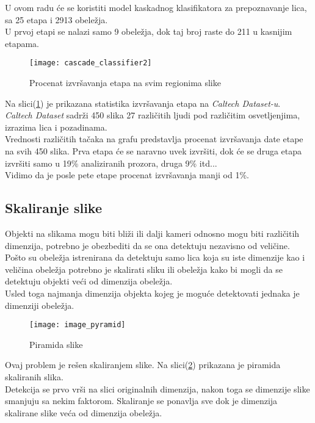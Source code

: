 U ovom radu će se koristiti model kaskadnog klasifikatora za
prepoznavanje lica, sa 25 etapa i 2913 obeležja. \\
U prvoj etapi se nalazi samo 9 obeležja, dok taj broj raste do 211 u kasnijim etapama.

\begin{figure}[H]
  \centering
  \texttt{[image: cascade\_classifier2]}
  \caption{Procenat izvršavanja etapa na svim regionima slike}
  \label{cascade_classifier_img2}
\end{figure}

Na slici(\ref{cascade_classifier_img2}) je prikazana statistika izvršavanja
etapa na \emph{Caltech Dataset-u}\cite{CALTECH_DATASET}.\\
\emph{Caltech Dataset} sadrži 450 slika 27 različitih
ljudi pod različitim osvetljenjima, izrazima lica i pozadinama. \\

Vrednosti različitih tačaka na grafu predstavlja procenat izvršavanja date etape
na svih 450 slika. Prva etapa će se naravno uvek izvršiti, dok će se druga etapa
izvršiti samo u 19\% analiziranih prozora, druga 9\% itd... \\
Vidimo da je posle pete etape procenat izvršavanja manji od 1\%. \\

\subsection{Skaliranje slike}\label{image_scaling}

Objekti na slikama mogu biti bliži ili dalji kameri odnosno mogu biti
različitih dimenzija, potrebno je obezbediti da se ona detektuju nezavisno od
veličine. \\

Pošto su obeležja istrenirana da detektuju samo lica koja su iste dimenzije kao
i veličina obeležja potrebno je skalirati sliku ili obeležja kako bi
mogli da se detektuju objekti veći od dimenzija obeležja. \\
Usled toga najmanja dimenzija objekta kojeg je moguće detektovati jednaka je dimenziji obeležja.

\begin{figure}[H]
  \centering
  \texttt{[image: image\_pyramid]}
  \caption{Piramida slike\cite{ImagePyramid_web}}
  \label{image_pyramid}
\end{figure}

Ovaj problem je rešen skaliranjem slike.
Na slici(\ref{image_pyramid}) prikazana je piramida skaliranih slika. \\
Detekcija se prvo vrši na slici originalnih dimenzija, nakon toga se dimenzije
slike smanjuju sa nekim faktorom.
Skaliranje se ponavlja sve dok je dimenzija skalirane slike veća od dimenzija
obeležja. \\

